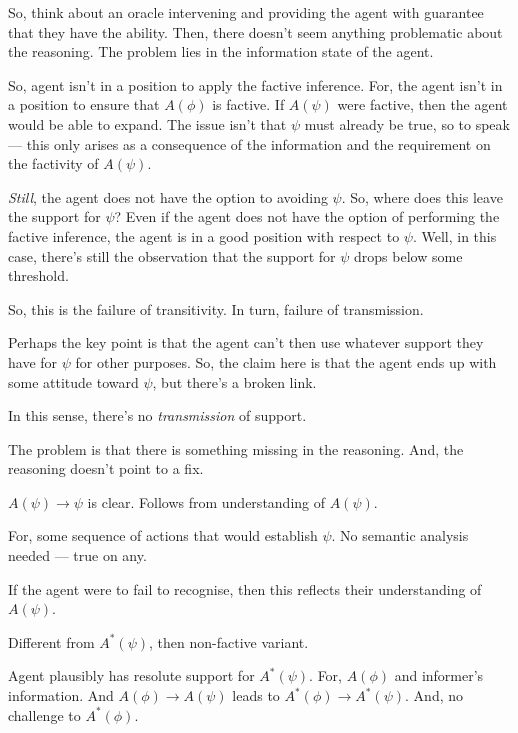 \documentclass[10pt]{article}
\begin{document}
\begin{note}[Oracle]
  So, think about an oracle intervening and providing the agent with guarantee that they have the ability.
  Then, there doesn't seem anything problematic about the reasoning.
  The problem lies in the information state of the agent.
\end{note}

\begin{note}
  So, agent isn't in a position to apply the factive inference.
  For, the agent isn't in a position to ensure that \(A(\phi)\) is factive.
  If \(A(\psi)\) were factive, then the agent would be able to expand.
  The issue isn't that \(\psi\) must already be true, so to speak --- this only arises as a consequence of the information and the requirement on the factivity of \(A(\psi)\).

  \emph{Still}, the agent does not have the option to avoiding \(\psi\).
  So, where does this leave the support for \(\psi\)?
  Even if the agent does not have the option of performing the factive inference, the agent is in a good position with respect to \(\psi\).
  Well, in this case, there's still the observation that the support for \(\psi\) drops below some threshold.

  So, this is the failure of transitivity.
  In turn, failure of transmission.

  Perhaps the key point is that the agent can't then use whatever support they have for \(\psi\) for other purposes.
  So, the claim here is that the agent ends up with some attitude toward \(\psi\), but there's a broken link.

  In this sense, there's no \emph{transmission} of support.

  The problem is that there is something missing in the reasoning.
  And, the reasoning doesn't point to a fix.
\end{note}

\begin{note}
  \(A(\psi) \rightarrow \psi\) is clear.
  Follows from understanding of \(A(\psi)\).

  For, some sequence of actions that would establish \(\psi\).
  No semantic analysis needed --- true on any.

  If the agent were to fail to recognise, then this reflects their understanding of \(A(\psi)\).

  Different from \(A^{*}(\psi)\), then non-factive variant.

  Agent plausibly has resolute support for \(A^{*}(\psi)\).
  For, \(A(\phi)\) and informer's information.
  And \(A(\phi) \rightarrow A(\psi)\) leads to \(A^{*}(\phi) \rightarrow A^{*}(\psi)\).
  And, no challenge to \(A^{*}(\phi)\).
\end{note}
\end{document}
